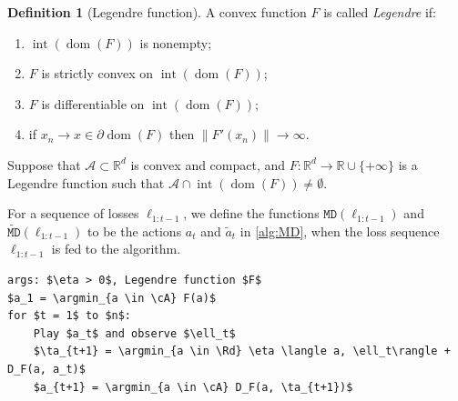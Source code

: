 \documentclass{article}
\theoremstyle{plain}
\theoremstyle{definition}
\newtheorem{definition}[theorem]{Definition}
\newcommand{\dom}[1]{\operatorname{dom}(#1)}
\newcommand{\R}{\mathbb R}
\newcommand{\Rd}{\mathbb{R}^d}
\newcommand{\argmin}{\operatornamewithlimits{arg\,min}}
\newcommand{\cA}{\mathcal A}
\newcommand{\interior}{\operatorname{int}}
\newcommand{\ta}{\tilde{a}}
\newcommand{\fmd}{\texttt{MD}}
\newcommand{\tfmd}{\widetilde{\texttt{MD}}}
\newcommand{\mdalg}{\textsf{MD}\xspace}
\begin{document}
\begin{mdframed}
    \begin{definition}[Legendre function]
        A convex function $F$ is called \emph{Legendre} if:
        \begin{enumerate}
            \item $\interior(\dom{F})$ is nonempty;
            \item $F$ is strictly convex on $\interior(\dom{F})$;
            \item $F$ is differentiable on $\interior(\dom{F})$;
            \item if $x_n\to x\in\partial\dom{F}$ then $\|F'(x_n)\|\to\infty$.
        \end{enumerate}
    \end{definition}
\end{mdframed}

Suppose that $\cA \subset \Rd$ is convex and compact,
and $F: \Rd \to \R \cup \{+\infty\}$ is a Legendre function such that $\cA \cap \interior(\dom{F}) \neq \emptyset$.


For a sequence of losses $\ell_{1:t-1}$, we define the functions $\fmd(\ell_{1:t-1})$
and $\tfmd(\ell_{1:t-1})$ to be the actions $a_t$ and $\ta_t$
in \cref{alg:MD}, when the loss sequence $\ell_{1:t-1}$ is fed to the algorithm.
\begin{algorithm}[h!]
    \begin{minipage}{12cm}
        \begin{mdframed}
            \begin{lstlisting}
args: $\eta > 0$, Legendre function $F$
$a_1 = \argmin_{a \in \cA} F(a)$
for $t = 1$ to $n$:
    Play $a_t$ and observe $\ell_t$
    $\ta_{t+1} = \argmin_{a \in \Rd} \eta \langle a, \ell_t\rangle + D_F(a, a_t)$
    $a_{t+1} = \argmin_{a \in \cA} D_F(a, \ta_{t+1})$
\end{lstlisting}
            \caption{\mdalg---
                It also holds that $a_{t+1} = \argmin_{a \in \cA} \eta \langle a, \ell_t\rangle + D_F(a, a_t)$.
            }\label{alg:MD}
        \end{mdframed}
    \end{minipage}
\end{algorithm}
\end{document}
